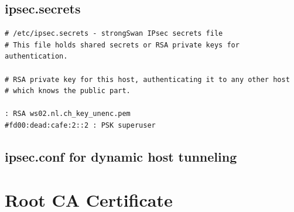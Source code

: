 \documentclass[a4paper]{report}
\begin{document}
\section{ipsec.secrets}
\label{app-sec:ipsec.secrets-P2P}
\begin{lstlisting}
# /etc/ipsec.secrets - strongSwan IPsec secrets file
# This file holds shared secrets or RSA private keys for authentication.

# RSA private key for this host, authenticating it to any other host
# which knows the public part.

: RSA ws02.nl.ch_key_unenc.pem
#fd00:dead:cafe:2::2 : PSK superuser
\end{lstlisting}

\section{ipsec.conf for dynamic host tunneling}
\label{app-sec:WorkingConf}

\chapter{Root CA Certificate}
\end{document}
